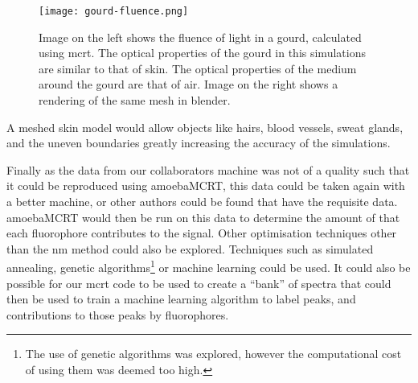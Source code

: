 \begin{figure}[!htpb]
    \centering
    \texttt{[image: gourd-fluence.png]}
    \caption{Image on the left shows the fluence of light in a gourd, calculated using \gls*{mcrt}. The optical properties of the gourd in this simulations are similar to that of skin. The optical properties of the medium around the gourd are that of air. Image on the right shows a rendering of the same mesh in blender.}
    \label{fig:mesh}
\end{figure}

A meshed skin model would allow objects like hairs, blood vessels, sweat glands, and the uneven boundaries greatly increasing the accuracy of the simulations.

Finally as the data from our collaborators machine was not of a quality such that it could be reproduced using amoebaMCRT, this data could be taken again with a better machine, or other authors could be found that have the requisite data. 
amoebaMCRT would then be run on this data to determine the amount of that each fluorophore contributes to the signal.
Other optimisation techniques other than the \gls*{nm} method could also be explored.
Techniques such as simulated annealing, genetic algorithms\footnote{The use of genetic algorithms was explored, however the computational cost of using them was deemed too high.} or machine learning could be used.
It could also be possible for our \gls*{mcrt} code to be used to create a ``bank'' of spectra that could then be used to train a machine learning algorithm to label peaks, and contributions to those peaks by fluorophores.
